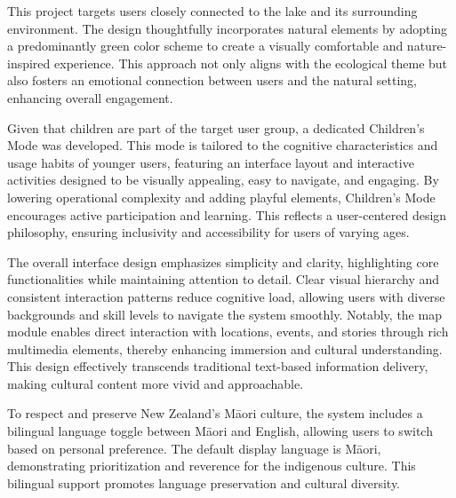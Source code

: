 ﻿%


This project targets users closely connected to the lake and its surrounding environment. The design thoughtfully incorporates natural elements by adopting a predominantly green color scheme to create a visually comfortable and nature-inspired experience. This approach not only aligns with the ecological theme but also fosters an emotional connection between users and the natural setting, enhancing overall engagement.

Given that children are part of the target user group, a dedicated Children’s Mode was developed. This mode is tailored to the cognitive characteristics and usage habits of younger users, featuring an interface layout and interactive activities designed to be visually appealing, easy to navigate, and engaging. By lowering operational complexity and adding playful elements, Children’s Mode encourages active participation and learning. This reflects a user-centered design philosophy, ensuring inclusivity and accessibility for users of varying ages.

The overall interface design emphasizes simplicity and clarity, highlighting core functionalities while maintaining attention to detail. Clear visual hierarchy and consistent interaction patterns reduce cognitive load, allowing users with diverse backgrounds and skill levels to navigate the system smoothly. Notably, the map module enables direct interaction with locations, events, and stories through rich multimedia elements, thereby enhancing immersion and cultural understanding. This design effectively transcends traditional text-based information delivery, making cultural content more vivid and approachable.

To respect and preserve New Zealand’s Māori culture, the system includes a bilingual language toggle between Māori and English, allowing users to switch based on personal preference. The default display language is Māori, demonstrating prioritization and reverence for the indigenous culture. This bilingual support promotes language preservation and cultural diversity.

